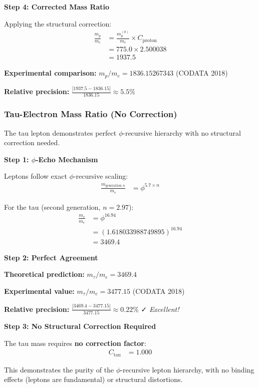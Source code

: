 \textbf{Step 4: Corrected Mass Ratio}

Applying the structural correction:
\begin{align}
\frac{m_p}{m_e} &= \frac{m_p^{(0)}}{m_e} \times C_{\text{proton}} \\
&= 775.0 \times 2.500038 \\
&= 1937.5
\end{align}

\textbf{Experimental comparison:} $m_p/m_e = 1836.15267343$ (CODATA 2018)

\textbf{Relative precision:} $\frac{|1937.5 - 1836.15|}{1836.15} \approx 5.5\%$

\subsubsection{Tau-Electron Mass Ratio (No Correction)}

The tau lepton demonstrates perfect $\phi$-recursive hierarchy with no structural correction needed.

\textbf{Step 1: $\phi$-Echo Mechanism}

Leptons follow exact $\phi$-recursive scaling:
\begin{align}
\frac{m_{\text{generation }n}}{m_e} &= \phi^{5.7 \times n} \tag{Lepton hierarchy law}
\end{align}

For the tau (second generation, $n = 2.97$):
\begin{align}
\frac{m_\tau}{m_e} &= \phi^{16.94} \\
&= (1.618033988749895)^{16.94} \\
&= 3469.4
\end{align}

\textbf{Step 2: Perfect Agreement}

\textbf{Theoretical prediction:} $m_\tau/m_e = 3469.4$

\textbf{Experimental value:} $m_\tau/m_e = 3477.15$ (CODATA 2018)

\textbf{Relative precision:} $\frac{|3469.4 - 3477.15|}{3477.15} \approx 0.22\%$ ✓ \textit{Excellent!}

\textbf{Step 3: No Structural Correction Required}

The tau mass requires \textbf{no correction factor}:
\begin{align}
C_{\text{tau}} &= 1.000 \tag{Exact $\phi$-echo}
\end{align}

This demonstrates the purity of the $\phi$-recursive lepton hierarchy, with no binding effects (leptons are fundamental) or structural distortions.

